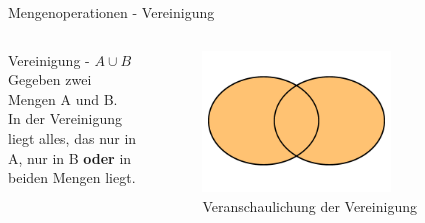 \begin{frame}{Mengenoperationen - Vereinigung}
\begin{columns}
    \begin{alertblock}{Vereinigung - $A\cup B$}
    Gegeben zwei Mengen A und B.\\
    In der Vereinigung liegt alles, das nur in A, nur in B \textbf{oder} in beiden Mengen liegt.
    \end{alertblock}
\begin{figure}
    \centering
    \includegraphics[width=0.7\textwidth]{../figures/AoderB.png}
    \caption{Veranschaulichung der Vereinigung}
    \label{fig:my_label}
\end{figure}
\end{columns}
\end{frame}

